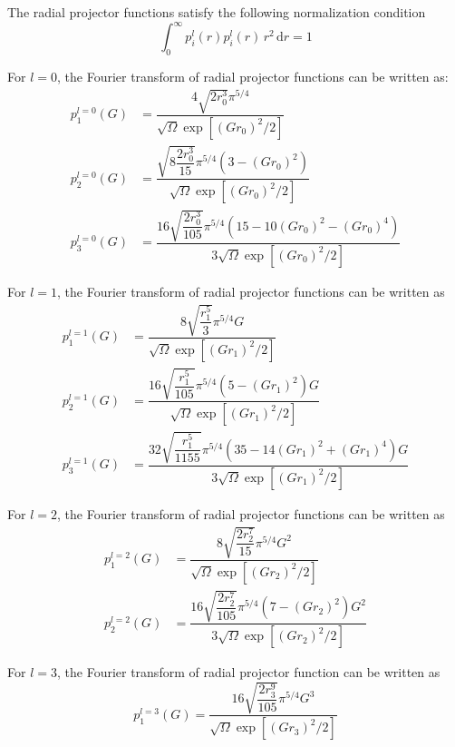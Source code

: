 The radial projector functions satisfy the following normalization condition
\begin{equation}
\int_{0}^{\infty} p_{i}^{l}(r) p_{i}^{l}(r)\, r^2\,\mathrm{d}r = 1
\end{equation}

For $l = 0$, the Fourier transform of radial projector functions can be written as:
\begin{align}
p^{l=0}_{1}(G) & = \dfrac
{4\sqrt{2r_0^3}\pi^{5/4}}
{\sqrt{\Omega}\exp\left[(Gr_0)^2/2\right]}
\\
p^{l=0}_{2}(G) & = \dfrac
{\sqrt{8\dfrac{2r_0^3}{15}}\pi^{5/4}
\left( 3-(Gr_0)^2 \right)}
{\sqrt{\Omega}\exp\left[(Gr_0)^2/2\right]}
\\
p^{l=0}_{3}(G) & = \dfrac
{16\sqrt{\dfrac{2r_0^3}{105}}\pi^{5/4}
\left(15 - 10(Gr_0)^2 - (Gr_0)^4 \right)}
{3\sqrt{\Omega}\exp\left[(Gr_0)^2/2\right]}
\end{align}

For $l=1$, the Fourier transform of radial projector functions can be written as
\begin{align}
p^{l=1}_{1}(G) & = \dfrac
{8\sqrt{\dfrac{r_1^5}{3}}\pi^{5/4}G}
{\sqrt{\Omega}\exp\left[(Gr_1)^2/2\right]}
\\
p^{l=1}_{2}(G) & = \dfrac
{16\sqrt{\dfrac{r_1^5}{105}}\pi^{5/4}
\left( 5 - (Gr_1)^2 \right)G}
{\sqrt{\Omega}\exp\left[(Gr_1)^2/2\right]}
\\
p^{l=1}_{3}(G) & = \dfrac
{32\sqrt{\dfrac{r_1^5}{1155}}\pi^{5/4}
\left( 35 - 14(Gr_1)^2 + (Gr_1)^4 \right)G}
{3\sqrt{\Omega}\exp\left[(Gr_1)^2/2\right]}
\end{align}


For $l=2$, the Fourier transform of radial projector functions can be written as
\begin{align}
p^{l=2}_{1}(G) & = \dfrac
{8\sqrt{\dfrac{2r_2^7}{15}}\pi^{5/4}G^2}
{\sqrt{\Omega}\exp\left[(Gr_2)^2/2\right]}
\\
p^{l=2}_{2}(G) & = \dfrac
{16\sqrt{\dfrac{2r_2^7}{105}}\pi^{5/4}
\left( 7 - (Gr_2)^2 \right)G^2}
{3\sqrt{\Omega}\exp\left[(Gr_2)^2/2\right]}
\end{align}

For $l=3$, the Fourier transform of radial projector function can be written as
\begin{equation}
p^{l=3}_{1}(G) = \dfrac
{16\sqrt{\dfrac{2r_3^9}{105}}\pi^{5/4}G^3}
{\sqrt{\Omega}\exp\left[(Gr_3)^2/2\right]}
\end{equation}


